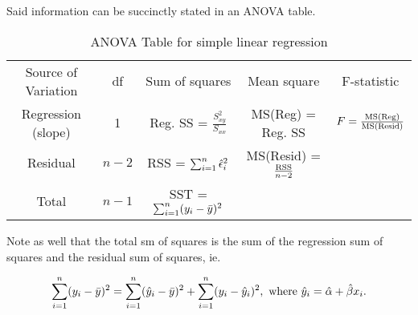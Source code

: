 \documentclass{homework}
\begin{document}
Said information can be succinctly stated in an ANOVA table.

\begin{table}
    \centering
    \caption{ANOVA Table for simple linear regression}
    \begin{tabular}{*5c}
        \toprule
        Source of Variation & df  & Sum of squares & Mean square & F-statistic \\    
        Regression (slope) & 1 & Reg. SS = $\frac{S_{xy}^2}{S_{xx}}$     & MS(Reg) = Reg. SS & $F = \frac{\textnormal {MS(Reg)}}{\textnormal {MS(Resid)}}$ \\
        Residual & $n-2$ & RSS = $\sum_{i=1}^{n} \hat{\epsilon}_i^2$ & MS(Resid) = $\frac{\textnormal{RSS}}{n-2}$  \\
        \hline
        Total & $n-1$ & SST = $\sum_{i=1}^{n} (y_i - \bar{y})^2$ & & \\
        \midrule
        \bottomrule
    \end{tabular}
\end{table}

Note as well that the total sm of squares is the sum of the regression sum of squares and the residual sum of squares, ie. 

$$
\sum_{i=1}^{n} (y_i - \bar{y})^2 = \sum_{i=1}^{n} (\hat{y}_i - \bar{y})^2 +  \sum_{i=1}^{n} (y_i - \hat{y}_i)^2, \textnormal{ where } \hat{y}_i = \hat \alpha + \hat \beta x_i. 
$$
\end{document}
